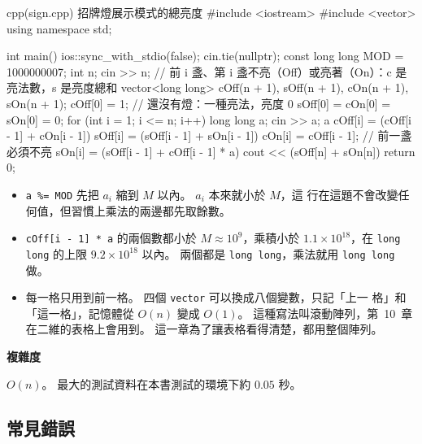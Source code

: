 \begin{example}[label=ex:sign]{cpp}{(sign.cpp) 招牌燈展示模式的總亮度}
#include <iostream>
#include <vector>
using namespace std;

int main() {
    ios::sync_with_stdio(false);
    cin.tie(nullptr);
    const long long MOD = 1000000007;
    int n;
    cin >> n;
    // 前 i 盞、第 i 盞不亮（Off）或亮著（On）：c 是亮法數，s 是亮度總和
    vector<long long> cOff(n + 1), sOff(n + 1), cOn(n + 1), sOn(n + 1);
    cOff[0] = 1;                        // 還沒有燈：一種亮法，亮度 0
    sOff[0] = cOn[0] = sOn[0] = 0;
    for (int i = 1; i <= n; i++) {
        long long a;
        cin >> a;
        a %
        cOff[i] = (cOff[i - 1] + cOn[i - 1]) %
        sOff[i] = (sOff[i - 1] + sOn[i - 1]) %
        cOn[i] = cOff[i - 1];                            // 前一盞必須不亮
        sOn[i] = (sOff[i - 1] + cOff[i - 1] * a) %
    }
    cout << (sOff[n] + sOn[n]) %
    return 0;
}
\end{example}


\begin{itemize}
\item \texttt{a \%= MOD} 先把 $a_i$ 縮到 $M$ 以內。 $a_i$ 本來就小於 $M$，這
行在這題不會改變任何值，但習慣上乘法的兩邊都先取餘數。
\item \texttt{cOff[i - 1] * a} 的兩個數都小於 $M \approx 10^9$，乘積小於
$1.1 \times 10^{18}$，在 \texttt{long long} 的上限 $9.2 \times 10^{18}$ 以內。
兩個都是 \texttt{long long}，乘法就用 \texttt{long long} 做。
\item 每一格只用到前一格。 四個 \texttt{vector} 可以換成八個變數，只記「上一
格」和「這一格」，記憶體從 $O(n)$ 變成 $O(1)$。 這種寫法叫滾動陣列，第~10~章
在二維的表格上會用到。 這一章為了讓表格看得清楚，都用整個陣列。
\end{itemize}

\textbf{複雜度}

$O(n)$。 最大的測試資料在本書測試的環境下約 $0.05$ 秒。

\subsection{常見錯誤}

